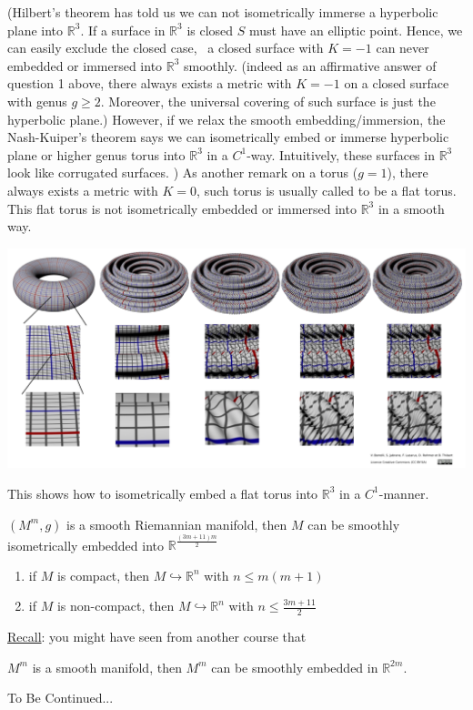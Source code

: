 \begin{enumerate}
    (Hilbert's theorem has told us we can not isometrically immerse 
    a hyperbolic plane into \(\mathbb{R}^3\). If a surface in \(\mathbb{R}^3\)
    is closed \(S\) must have an elliptic point. Hence, 
    we can easily exclude the closed case, \ie\ a closed surface with \(K=-1\)
    can never embedded or immersed into \(\mathbb{R}^3\) smoothly. 
    (indeed as an affirmative answer of question 1 above, there always exists
    a metric with \(K=-1\) on a closed surface with genus \(g\ge 2\). 
    Moreover, the universal covering of such surface is just the hyperbolic
    plane.)
    However, if we relax the smooth embedding/immersion, the Nash-Kuiper's 
    theorem says we can isometrically embed or immerse hyperbolic plane
    or higher genus torus into \(\mathbb{R}^3\) in a \(C^1\)-way. Intuitively,
    these surfaces in \(\mathbb{R}^3\) look like corrugated surfaces.
    )
    As another remark on a torus (\(g=1\)), there always exists a metric
    with \(K=0\), such torus is usually called to be a flat torus. This flat
    torus is not isometrically embedded or immersed into \(\mathbb{R}^3\) in
    a smooth way.
    \begin{center}
        \includegraphics[scale=0.3]{picture/final remark/corrugated.png}
    \end{center}
    This shows how to isometrically embed a flat torus into \(\mathbb{R}^3\)
    in a \(C^1\)-manner.
    \begin{theorem}
        \((M^m,g)\) is a smooth Riemannian manifold, then \(M\) can 
        be smoothly isometrically embedded into \(\mathbb{R}^{
            \frac{(3m+11)m}{2}
        }\)
        \begin{enumerate}[(1)]
            \item if \(M\) is compact, then 
            \(M\hookrightarrow \mathbb{R}^n\) with 
            \(n\le m(m+1)\)
            \item if \(M\) is non-compact, then \(M 
            \hookrightarrow \mathbb{R}^n\) with 
            \(n\le \frac{3m+11}{2}\)
        \end{enumerate}
    \end{theorem}
    \underline{Recall}: you might have seen from another course
    that 
    \begin{theorem}
        \(M^m\) is a smooth manifold, then \(M^m\) can be smoothly embedded in
        \(\mathbb{R}^{2m}\).
    \end{theorem}
\end{enumerate}
\begin{center}
    {\Huge To Be Continued...}    
\end{center}
